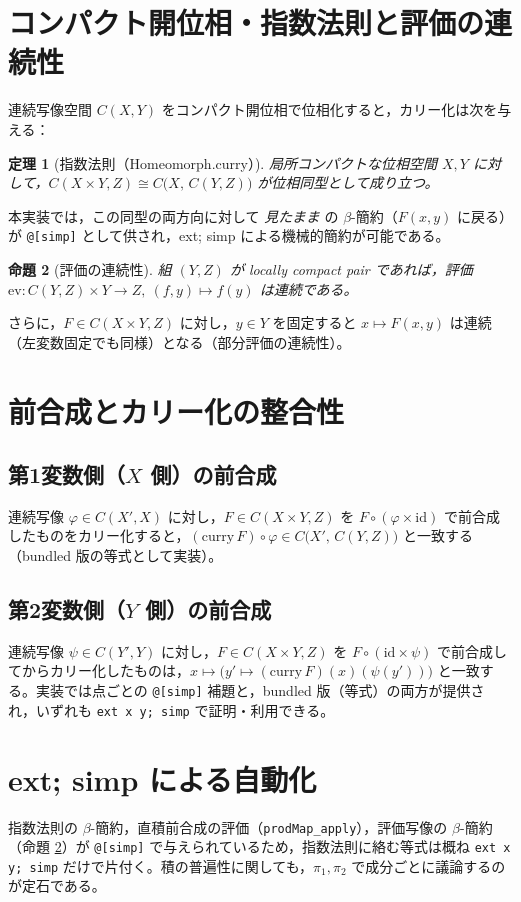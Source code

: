 \documentclass[11pt]{jsarticle}
\newtheorem{theorem}{定理}
\newtheorem{proposition}[theorem]{命題}
\theoremstyle{remark}
\begin{document}
\section{コンパクト開位相・指数法則と評価の連続性}
連続写像空間 $C(X,Y)$ をコンパクト開位相で位相化すると，カリー化は次を与える：
\begin{theorem}[指数法則（Homeomorph.curry）]\label{thm:exp}
\emph{局所コンパクト}な位相空間 $X,Y$ に対して，$C(X\times Y, Z)\cong C\bigl(X,\,C(Y,Z)\bigr)$ が位相同型として成り立つ。
\end{theorem}

\noindent 本実装では，この同型の両方向に対して \emph{見たまま} の $\beta$-簡約（$F(x,y)$ に戻る）が \verb|@[simp]| として供され，ext; simp による機械的簡約が可能である。

\begin{proposition}[評価の連続性]\label{prop:eval}
組 $(Y,Z)$ が \emph{locally compact pair} であれば，評価 $\mathrm{ev}: C(Y,Z)\times Y\to Z,\ (f,y)\mapsto f(y)$ は連続である。
\end{proposition}

\noindent さらに，$F\in C(X\times Y,Z)$ に対し，$y\in Y$ を固定すると $x\mapsto F(x,y)$ は連続（左変数固定でも同様）となる（部分評価の連続性）。

\section{前合成とカリー化の整合性}
\subsection*{第1変数側（$X$ 側）の前合成}
連続写像 $\varphi\in C(X',X)$ に対し，$F\in C(X\times Y,Z)$ を $F\circ(\varphi\times\mathrm{id})$ で前合成したものをカリー化すると，$(\mathrm{curry}\,F)\circ\varphi\in C\bigl(X',\,C(Y,Z)\bigr)$ と一致する（bundled 版の等式として実装）。

\subsection*{第2変数側（$Y$ 側）の前合成}
連続写像 $\psi\in C(Y',Y)$ に対し，$F\in C(X\times Y,Z)$ を $F\circ(\mathrm{id}\times\psi)$ で前合成してからカリー化したものは，$x\mapsto\bigl(y'\mapsto (\mathrm{curry}\,F)(x)(\psi(y'))\bigr)$ と一致する。実装では点ごとの \verb|@[simp]| 補題と，bundled 版（等式）の両方が提供され，いずれも \verb|ext x y; simp| で証明・利用できる。

\section{ext; simp による自動化}
指数法則の $\beta$-簡約，直積前合成の評価（\verb|prodMap_apply|），評価写像の $\beta$-簡約（命題 \ref{prop:eval}）が \verb|@[simp]| で与えられているため，指数法則に絡む等式は概ね \verb|ext x y; simp| だけで片付く。積の普遍性に関しても，$\pi_1,\pi_2$ で成分ごとに議論するのが定石である。
\end{document}
